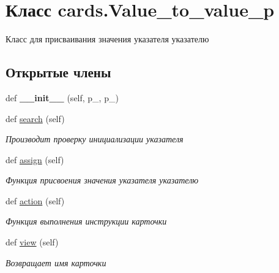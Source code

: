 \hypertarget{classcards_1_1_value__to__value__p}{}\section{Класс cards.\+Value\+\_\+to\+\_\+value\+\_\+p}
\label{classcards_1_1_value__to__value__p}


Класс для присваивания значения указателя указателю  


\subsection*{Открытые члены}
\begin{DoxyCompactItemize}
\item 
\mbox{\label{classcards_1_1_value__to__value__p_aa377243f00c6fbbe709db44853f11cf0}} 
def {\bfseries \+\_\+\+\_\+init\+\_\+\+\_\+} (self, p\+\_, p\+\_)
\item 
\mbox{\label{classcards_1_1_value__to__value__p_a4913693a20f937a175a8668979a45700}} 
def \mbox{\hyperlink{classcards_1_1_value__to__value__p_a4913693a20f937a175a8668979a45700}{search}} (self)
\begin{DoxyCompactList}\small\item\em Производит проверку инициализации указателя \end{DoxyCompactList}\item 
def \mbox{\hyperlink{classcards_1_1_value__to__value__p_ad215a910d5ebcfd34ecbb710c9c8a086}{assign}} (self)
\begin{DoxyCompactList}\small\item\em Функция присвоения значения указателя указателю \end{DoxyCompactList}\item 
def \mbox{\hyperlink{classcards_1_1_value__to__value__p_a0f506f22814df6d698d53826c1c674d3}{action}} (self)
\begin{DoxyCompactList}\small\item\em Функция выполнения инструкции карточки \end{DoxyCompactList}\item 
def \mbox{\hyperlink{classcards_1_1_value__to__value__p_abd0d54ff798992b157cae1a996ee972a}{view}} (self)
\begin{DoxyCompactList}\small\item\em Возвращает имя карточки \end{DoxyCompactList}\end{DoxyCompactItemize}
